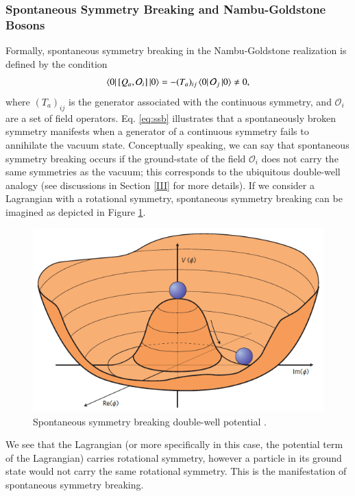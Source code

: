 \documentclass[aps,prd,onecolumn,showpacs,amsmath,amssymb,nofootinbib]{revtex4} \pdfoutput=1
\begin{document}
\subsubsection{Spontaneous Symmetry Breaking and Nambu-Goldstone Bosons}
Formally, spontaneous symmetry breaking in the Nambu-Goldstone realization is defined by the condition
\begin{equation}\label{eq:ssb}
    \bra{0} \left[ Q_{a},\mathcal{O}_{i}\right]\ket{0} = -(T_{a})_{ij}\bra{0}\mathcal{O}_{j}\ket{0}\neq 0,
\end{equation}
where $(T_{a})_{ij}$ is the generator associated with the continuous symmetry, and $\mathcal{O}_i$ are a set of field operators. Eq. \eqref{eq:ssb} illustrates that a spontaneously broken symmetry manifests when a generator of a continuous symmetry fails to annihilate the vacuum state. Conceptually speaking, we can say that spontaneous symmetry breaking occurs if the ground-state of the field $\mathcal{O}_{i}$ does not carry the same symmetries as the vacuum; this corresponds to the ubiquitous double-well analogy (see discussions in Section \ref{III} for more details). If we consider a Lagrangian with a rotational symmetry, spontaneous symmetry breaking can be imagined as depicted in Figure \ref{fig:ssb}. 
\begin{figure}[!ht]
    \centering
    \includegraphics[scale=0.5]{higgspotential.png}
    \caption{Spontaneous symmetry breaking double-well potential \cite{doi:10.1142/9789814733519_0014}.} 
    \label{fig:ssb}
\end{figure}
We see that the Lagrangian (or more specifically in this case, the potential term of the Lagrangian) carries rotational symmetry, however a particle in its ground state would not carry the same rotational symmetry. This is the manifestation of spontaneous symmetry breaking.
\end{document}
